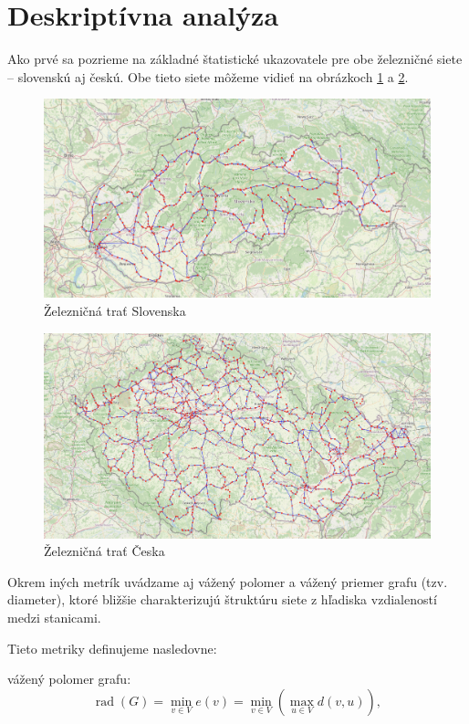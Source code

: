 \documentclass[main.tex]{subfiles}
\begin{document}
\section{Deskriptívna analýza}
Ako prvé sa pozrieme na základné štatistické ukazovatele pre obe železničné siete – slovenskú aj českú. Obe tieto siete môžeme vidieť na obrázkoch \ref{obr:1} a \ref{obr:2}.
\begin{figure}
    \centerline{\includegraphics[width=1.2\textwidth]{images/sk_railroads.png}}
    \caption{Železničná trať Slovenska}
    \label{obr:1}
\end{figure}

\begin{figure}
    \centerline{\includegraphics[width=1.2\textwidth]{images/cze_railroads.png}}
    \caption{Železničná trať Česka}
    \label{obr:2}
\end{figure}


Okrem iných metrík uvádzame aj vážený polomer a vážený priemer grafu (tzv. diameter), ktoré bližšie charakterizujú štruktúru siete z hľadiska vzdialeností medzi stanicami.

Tieto metriky definujeme nasledovne:

vážený polomer grafu:
\[
\operatorname{rad}(G) = \min_{v \in V} e(v) = \min_{v \in V} \left( \max_{u \in V} d(v, u) \right),
\]
\end{document}
